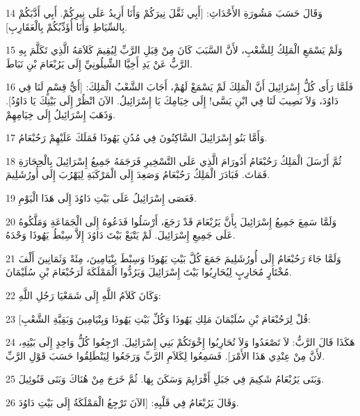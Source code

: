\par 14 وَقَالَ حَسَبَ مَشُورَةِ الأَحْدَاثِ: [أَبِي ثَقَّلَ نِيرَكُمْ وَأَنَا أَزِيدُ عَلَى نِيرِكُمْ. أَبِي أَدَّبَكُمْ بِالسِّيَاطِ وَأَنَا أُؤَدِّبُكُمْ بِالْعَقَارِبِ].
\par 15 وَلَمْ يَسْمَعِ الْمَلِكُ لِلشَّعْبِ، لأَنَّ السَّبَبَ كَانَ مِنْ قِبَلِ الرَّبِّ لِيُقِيمَ كَلاَمَهُ الَّذِي تَكَلَّمَ بِهِ الرَّبُّ عَنْ يَدِ أَخِيَّا الشِّيلُونِيِّ إِلَى يَرُبْعَامَ بْنِ نَبَاطَ.
\par 16 فَلَمَّا رَأَى كُلُّ إِسْرَائِيلَ أَنَّ الْمَلِكَ لَمْ يَسْمَعْ لَهُمْ، أَجَابَ الشَّعْبُ الْمَلِكَ: [أَيُّ قِسْمٍ لَنَا فِي دَاوُدَ، وَلاَ نَصِيبَ لَنَا فِي ابْنِ يَسَّى! إِلَى خِيَامِكَ يَا إِسْرَائِيلُ. الآنَ انْظُرْ إِلَى بَيْتِكَ يَا دَاوُدُ]. وَذَهَبَ إِسْرَائِيلُ إِلَى خِيَامِهِمْ.
\par 17 وَأَمَّا بَنُو إِسْرَائِيلَ السَّاكِنُونَ فِي مُدُنِ يَهُوذَا فَمَلَكَ عَلَيْهِمْ رَحُبْعَامُ.
\par 18 ثُمَّ أَرْسَلَ الْمَلِكُ رَحُبْعَامُ أَدُورَامَ الَّذِي عَلَى التَّسْخِيرِ فَرَجَمَهُ جَمِيعُ إِسْرَائِيلَ بِالْحِجَارَةِ فَمَاتَ. فَبَادَرَ الْمَلِكُ رَحُبْعَامُ وَصَعِدَ إِلَى الْمَرْكَبَةِ لِيَهْرُبَ إِلَى أُورُشَلِيمَ.
\par 19 فَعَصَى إِسْرَائِيلُ عَلَى بَيْتِ دَاوُدَ إِلَى هَذَا الْيَوْمِ.
\par 20 وَلَمَّا سَمِعَ جَمِيعُ إِسْرَائِيلَ بِأَنَّ يَرُبْعَامَ قَدْ رَجَعَ، أَرْسَلُوا فَدَعُوهُ إِلَى الْجَمَاعَةِ وَمَلَّكُوهُ عَلَى جَمِيعِ إِسْرَائِيلَ. لَمْ يَتْبَعْ بَيْتَ دَاوُدَ إِلاَّ سِبْطُ يَهُوذَا وَحْدَهُ.
\par 21 وَلَمَّا جَاءَ رَحُبْعَامُ إِلَى أُورُشَلِيمَ جَمَعَ كُلَّ بَيْتِ يَهُوذَا وَسِبْطَ بِنْيَامِينَ، مِئَةً وَثَمَانِينَ أَلْفَ مُخْتَارٍ مُحَارِبٍ لِيُحَارِبُوا بَيْتَ إِسْرَائِيلَ وَيَرُدُّوا الْمَمْلَكَةَ لَرَحُبْعَامَ بْنِ سُلَيْمَانَ.
\par 22 وَكَانَ كَلاَمُ اللَّهِ إِلَى شَمَعْيَا رَجُلِ اللَّهِ:
\par 23 [قُلْ لِرَحُبْعَامَ بْنِ سُلَيْمَانَ مَلِكِ يَهُوذَا وَكُلِّ بَيْتِ يَهُوذَا وَبِنْيَامِينَ وَبَقِيَّةِ الشَّعْبِ:
\par 24 هَكَذَا قَالَ الرَّبُّ: لاَ تَصْعَدُوا وَلاَ تُحَارِبُوا إِخْوَتَكُمْ بَنِي إِسْرَائِيلَ. ارْجِعُوا كُلُّ وَاحِدٍ إِلَى بَيْتِهِ، لأَنَّ مِنْ عِنْدِي هَذَا الأَمْرَ]. فَسَمِعُوا لِكَلاَمِ الرَّبِّ وَرَجَعُوا لِيَنْطَلِقُوا حَسَبَ قَوْلِ الرَّبِّ.
\par 25 وَبَنَى يَرُبْعَامُ شَكِيمَ فِي جَبَلِ أَفْرَايِمَ وَسَكَنَ بِهَا. ثُمَّ خَرَجَ مِنْ هُنَاكَ وَبَنَى فَنُوئِيلَ.
\par 26 وَقَالَ يَرُبْعَامُ فِي قَلْبِهِ: [الآنَ تَرْجِعُ الْمَمْلَكَةُ إِلَى بَيْتِ دَاوُدَ.
